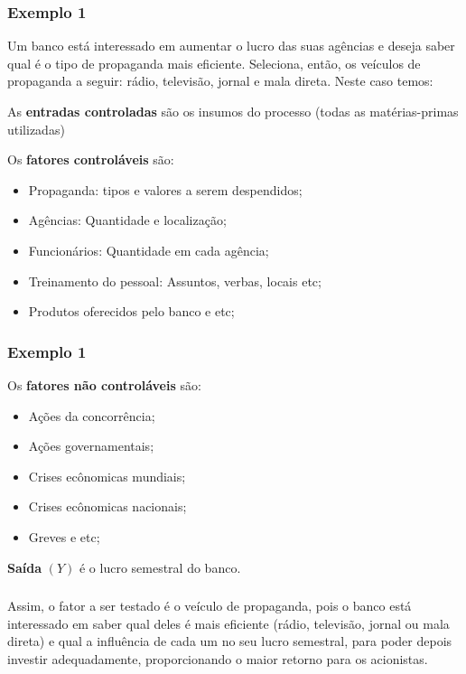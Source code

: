 \documentclass[14pt,aspectratio=1610]{beamer}
\begin{document}
\begin{frame}{}
\frametitle{Exemplo 1}
\begin{block}{}
\justifying
Um banco está interessado em aumentar o lucro das suas agências e deseja saber qual é o tipo de propaganda mais eficiente. Seleciona, então, os veículos de propaganda a seguir: rádio, televisão, jornal e mala direta. Neste caso temos:

As {\bf entradas controladas} são os insumos do processo (todas as matérias-primas utilizadas)

Os {\bf fatores controláveis} são:
\begin{itemize}
\item Propaganda: tipos e valores a serem despendidos;\pause
\item Agências: Quantidade e localização;\pause
\item Funcionários: Quantidade em cada agência;\pause
\item Treinamento do pessoal: Assuntos, verbas, locais etc;\pause
\item Produtos oferecidos pelo banco e etc;
\end{itemize}
\end{block}
\end{frame}

\begin{frame}{}
\frametitle{Exemplo 1}
\begin{block}{}
\justifying
Os {\bf fatores não controláveis} são:
\begin{itemize}
\item Ações da concorrência;\pause
\item Ações governamentais;\pause
\item Crises ecônomicas mundiais;\pause
\item Crises ecônomicas nacionais;\pause
\item Greves e etc;
\end{itemize}

{\bf Saída} $(Y)$ é o lucro semestral do banco.

\end{block}
\end{frame}

\begin{frame}{}
\frametitle{}
\begin{block}{}
\justifying
Assim, o fator a ser testado é o veículo de propaganda, pois o banco está interessado em saber qual deles é mais eficiente (rádio, televisão, jornal ou mala direta) e qual a influência de cada um no seu lucro semestral, para poder depois investir adequadamente, proporcionando o maior retorno para os acionistas.
\end{block}
\end{frame}
\end{document}
